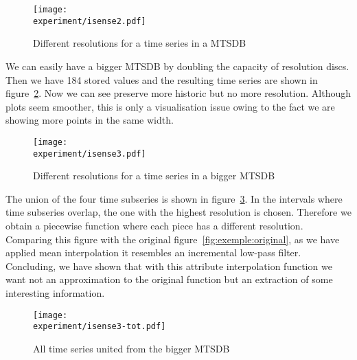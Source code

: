 \begin{figure}[tp]
\centering
\texttt{[image: \\experiment/isense2.pdf]}
\caption{Different resolutions for a time series in a MTSDB}
\label{fig:exemple:4mrd}
\end{figure}

We can easily have a bigger MTSDB by doubling the capacity of
resolution discs. Then we have 184 stored values and the resulting
time series are shown in figure~\ref{fig:exemple:4mrdbigger}.  Now we
can see preserve more historic but no more resolution. Although plots seem
smoother, this is only a visualisation issue owing to the fact we are
showing more points in the same width.



\begin{figure}[tp]
\centering
\texttt{[image: \\experiment/isense3.pdf]}
\caption{Different resolutions for a time series in a bigger MTSDB}
\label{fig:exemple:4mrdbigger}
\end{figure}


The union of the four time subseries is shown in
figure~\ref{fig:exemple:4mrdtot}. In the intervals where time
subseries overlap, the one with the highest resolution is
chosen. Therefore we obtain a piecewise function where each piece has
a different resolution. Comparing this figure with the original
figure~\ref{fig:exemple:original}, as we have applied mean
interpolation it resembles an incremental low-pass filter. Concluding,
we have shown that with this attribute interpolation function we want
not an approximation to the original function but an extraction of
some interesting information.



\begin{figure}[tp]
\centering
\texttt{[image: \\experiment/isense3-tot.pdf]}
\caption{All time series united from the bigger MTSDB}
\label{fig:exemple:4mrdtot}
\end{figure}



